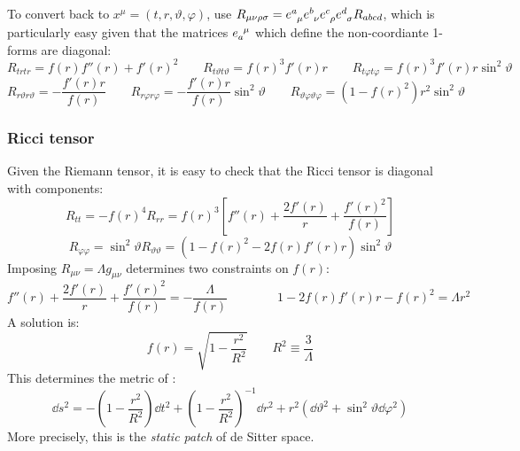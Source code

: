 To convert back to $ x^\mu = (t,r,\vartheta,\varphi) $, use $ R_{\mu \nu \rho \sigma} = \tensor{e}{^a_\mu} \tensor{e}{^b_\nu} \tensor{e}{^c_\rho} \tensor{e}{^d_\sigma} R_{abcd} $, which is particularly easy given that the matrices $ \tensor{e}{_a^\mu} $ which define the non-coordiante 1-forms are diagonal:
\begin{equation*}
  R_{trtr} = f(r) f''(r) + f'(r)^2
  \qquad
  R_{t \vartheta t \vartheta} = f(r)^3 f'(r) r
  \qquad
  R_{t \varphi t \varphi} = f(r)^3 f'(r) r \sin^2 \vartheta
\end{equation*}
\begin{equation*}
  R_{r \vartheta r \vartheta} = - \frac{f'(r) r}{f(r)}
  \qquad
  R_{r \varphi r \varphi} = - \frac{f'(r) r}{f(r)} \sin^2 \vartheta
  \qquad
  R_{\vartheta \varphi \vartheta \varphi} = (1 - f(r)^2) r^2 \sin^2 \vartheta
\end{equation*}

\subsubsection{Ricci tensor}

Given the Riemann tensor, it is easy to check that the Ricci tensor is diagonal with components:
\begin{equation*}
  R_{tt} = - f(r)^4 R_{rr} = f(r)^3 \left[ f''(r) + \frac{2f'(r)}{r} + \frac{f'(r)^2}{f(r)} \right]
\end{equation*}
\begin{equation*}
  R_{\varphi \varphi} = \sin^2 \vartheta R_{\vartheta \vartheta} = (1 - f(r)^2 - 2 f(r) f'(r) r) \sin^2 \vartheta
\end{equation*}
Imposing $ R_{\mu \nu} = \Lambda g_{\mu \nu} $ determines two constraints on $ f(r) $:
\begin{equation*}
  f''(r) + \frac{2f'(r)}{r} + \frac{f'(r)^2}{f(r)} = - \frac{\Lambda}{f(r)}
  \qquad \qquad
  1 - 2 f(r) f'(r) r - f(r)^2 = \Lambda r^2
\end{equation*}
A solution is:
\begin{equation*}
  f(r) = \sqrt{1 - \frac{r^2}{R^2}}
  \qquad
  R^2 \equiv \frac{3}{\Lambda}
\end{equation*}
This determines the metric of :
\begin{equation}
  \dd s^2 = - \left( 1 - \frac{r^2}{R^2} \right) \dd t^2 + \left( 1 - \frac{r^2}{R^2} \right)^{-1} \dd r^2 + r^2 (\dd \vartheta^2 + \sin^2 \vartheta \dd \varphi^2)
  \label{eq:dS-metric}
\end{equation}
More precisely, this is the \textit{static patch} of de Sitter space.

